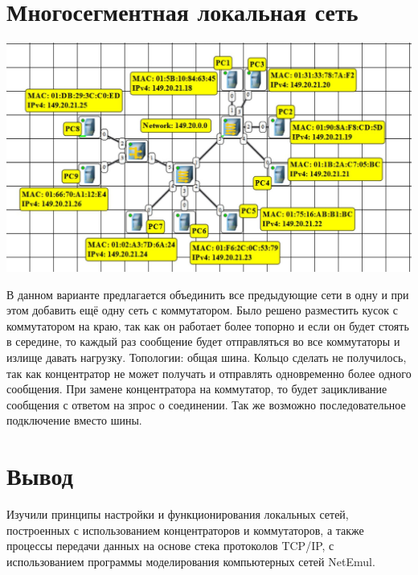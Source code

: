 \documentclass{article}
\begin{document}
\section{Многосегментная локальная сеть}
\begin{center}
    \includegraphics[width=.9\textwidth]{mm1.jpg}
\end{center}
В данном варианте предлагается объединить все предыдующие сети в одну и при этом добавить ещё одну сеть с коммутатором.
Было решено разместить кусок с коммутатором на краю, так как он работает более топорно и если он будет стоять в середине, то каждый раз сообщение будет отправляться во все коммутаторы и излище давать нагрузку. 
Топологии: общая шина. Кольцо сделать не получилось, так как концентратор не может получать и отправлять одновременно более одного сообщения. При замене концентратора на коммутатор, то будет зацикливание сообщения с ответом на зпрос о соединении. 
Так же возможно последовательное подключение вместо шины. 


\section{Вывод}
Изучили принципы настройки и функционирования локальных сетей,
построенных с использованием концентраторов и коммутаторов, а также
процессы передачи данных на основе стека протоколов TCP/IP, с
использованием программы моделирования компьютерных сетей NetEmul.
\end{document}
